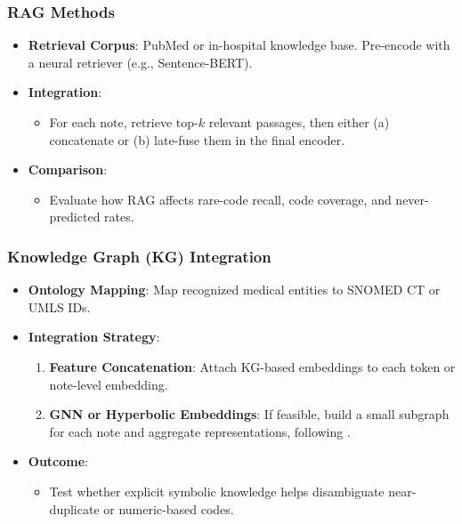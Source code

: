 \documentclass[12pt,a4paper]{report}
\begin{document}
\subsubsection{RAG Methods}
\begin{itemize}
    \item \textbf{Retrieval Corpus}: PubMed or in-hospital knowledge base. Pre-encode with a neural retriever (e.g., Sentence-BERT).
    \item \textbf{Integration}:
    \begin{itemize}
        \item For each note, retrieve top-$k$ relevant passages, then either (a) concatenate or (b) late-fuse them in the final encoder.
    \end{itemize}
    \item \textbf{Comparison}:
    \begin{itemize}
        \item Evaluate how RAG affects rare-code recall, code coverage, and never-predicted rates.
    \end{itemize}
\end{itemize}

\subsubsection{Knowledge Graph (KG) Integration}
\begin{itemize}
    \item \textbf{Ontology Mapping}: Map recognized medical entities to SNOMED CT or UMLS IDs.
    \item \textbf{Integration Strategy}:
    \begin{enumerate}
        \item \textbf{Feature Concatenation}: Attach KG-based embeddings to each token or note-level embedding.
        \item \textbf{GNN or Hyperbolic Embeddings}: If feasible, build a small subgraph for each note and aggregate representations, following \cite{ren2022hicu}.
    \end{enumerate}
    \item \textbf{Outcome}:
    \begin{itemize}
        \item Test whether explicit symbolic knowledge helps disambiguate near-duplicate or numeric-based codes.
    \end{itemize}
\end{itemize}
\end{document}
